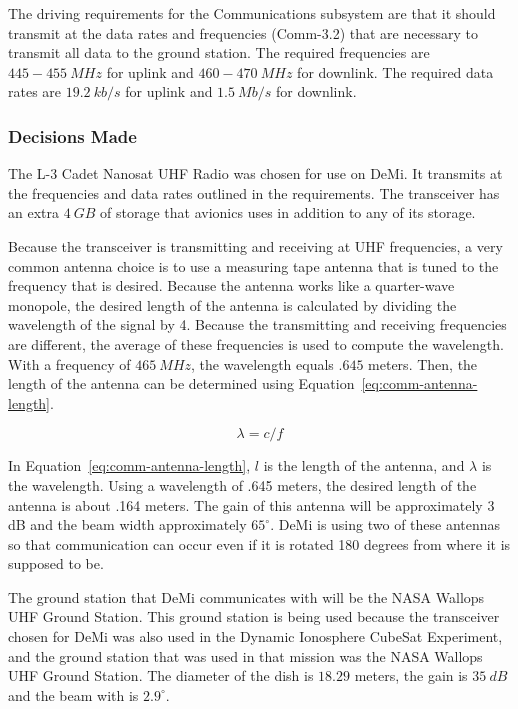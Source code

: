 \documentclass[12pt]{article}
\begin{document}
The driving requirements for the Communications subsystem are that it should transmit at the data rates and frequencies (Comm-3.2) that are necessary to transmit all data to the ground station. The required frequencies are $445-455\ MHz$ for uplink and $460-470\ MHz$ for downlink. The required data rates are $19.2\ kb/s$ for uplink and $1.5\ Mb/s$ for downlink.

			\subsubsection{Decisions Made}\label{sec:comm_decisions}

The L-3 Cadet Nanosat UHF Radio was chosen for use on DeMi. It transmits at the frequencies and data rates outlined in the requirements. The transceiver has an extra $4\ GB$ of storage that avionics uses in addition to any of its storage. 

Because the transceiver is transmitting and receiving at UHF frequencies, a very common antenna choice is to use a measuring tape antenna that is tuned to the frequency that is desired. Because the antenna works like a quarter-wave monopole, the desired length of the antenna is calculated by dividing the wavelength of the signal by 4. Because the transmitting and receiving frequencies are different, the average of these frequencies is used to compute the wavelength. With a frequency of $465\ MHz$, the wavelength equals $.645$ meters. Then, the length of the antenna can be determined using Equation~\ref{eq:comm-antenna-length}.

\begin{equation}\label{eq:comm-antenna-length}
\lambda = c/f
\end{equation}

In Equation~\ref{eq:comm-antenna-length}, $l$ is the length of the antenna, and $\lambda$ is the wavelength.
Using a wavelength of .645 meters, the desired length of the antenna is about .164 meters. The
gain of this antenna will be approximately 3 dB and the beam width approximately $65^\circ$. DeMi is
using two of these antennas so that communication can occur even if it is rotated 180 degrees
from where it is supposed to be.

The ground station that DeMi communicates with will be the NASA Wallops UHF Ground Station. This ground station is being used because the transceiver chosen for DeMi was also used in the Dynamic Ionosphere CubeSat Experiment, and the ground station that was used in that mission was the NASA Wallops UHF Ground Station. The diameter of the dish is $18.29$ meters, the gain is $35\ dB$ and the beam with is $2.9^\circ$.
\end{document}
